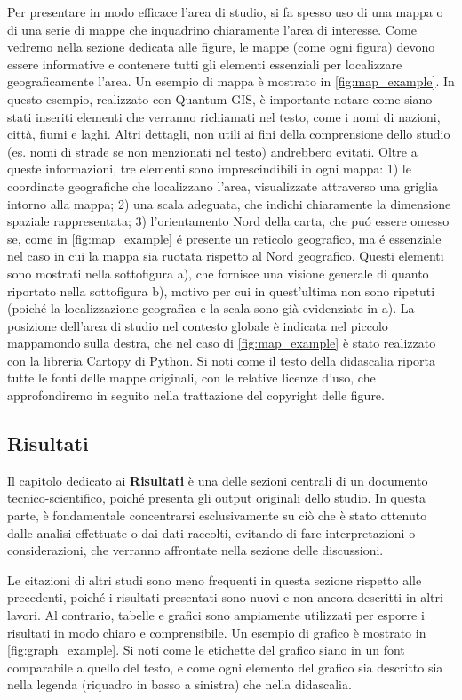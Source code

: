 \documentclass[9pt,a4paper,twoside]{rho-class/rho}
\begin{document}
Per presentare in modo efficace l’area di studio, si fa spesso uso di una mappa o di una serie di mappe che inquadrino chiaramente l’area di interesse. Come vedremo nella sezione dedicata alle figure, le mappe (come ogni figura) devono essere informative e contenere tutti gli elementi essenziali per localizzare geograficamente l’area. Un esempio di mappa è mostrato in \autoref{fig:map_example}. In questo esempio, realizzato con Quantum GIS, è importante notare come siano stati inseriti elementi che verranno richiamati nel testo, come i nomi di nazioni, città, fiumi e laghi. Altri dettagli, non utili ai fini della comprensione dello studio (es. nomi di strade se non menzionati nel testo) andrebbero evitati. Oltre a queste informazioni, tre elementi sono imprescindibili in ogni mappa: 1) le coordinate geografiche che localizzano l’area, visualizzate attraverso una griglia intorno alla mappa; 2) una scala adeguata, che indichi chiaramente la dimensione spaziale rappresentata; 3) l'orientamento Nord della carta, che puó essere omesso se, come in \autoref{fig:map_example} é presente un reticolo geografico, ma é essenziale nel caso in cui la mappa sia ruotata rispetto al Nord geografico. Questi elementi sono mostrati nella sottofigura a), che fornisce una visione generale di quanto riportato nella sottofigura b), motivo per cui in quest’ultima non sono ripetuti (poiché la localizzazione geografica e la scala sono già evidenziate in a). La posizione dell’area di studio nel contesto globale è indicata nel piccolo mappamondo sulla destra, che nel caso di \autoref{fig:map_example} è stato realizzato con la libreria Cartopy di Python. Si noti come il testo della didascalia riporta tutte le fonti delle mappe originali, con le relative licenze d'uso, che approfondiremo in seguito nella trattazione del copyright delle figure.


\subsection{Risultati}
Il capitolo dedicato ai \textbf{Risultati} è una delle sezioni centrali di un documento tecnico-scientifico, poiché presenta gli output originali dello studio. In questa parte, è fondamentale concentrarsi esclusivamente su ciò che è stato ottenuto dalle analisi effettuate o dai dati raccolti, evitando di fare interpretazioni o considerazioni, che verranno affrontate nella sezione delle discussioni.

Le citazioni di altri studi sono meno frequenti in questa sezione rispetto alle precedenti, poiché i risultati presentati sono nuovi e non ancora descritti in altri lavori. Al contrario, tabelle e grafici sono ampiamente utilizzati per esporre i risultati in modo chiaro e comprensibile. Un esempio di grafico è mostrato in \autoref{fig:graph_example}. Si noti come le etichette del grafico siano in un font comparabile a quello del testo, e come ogni elemento del grafico sia descritto sia nella legenda (riquadro in basso a sinistra) che nella didascalia.
\end{document}
